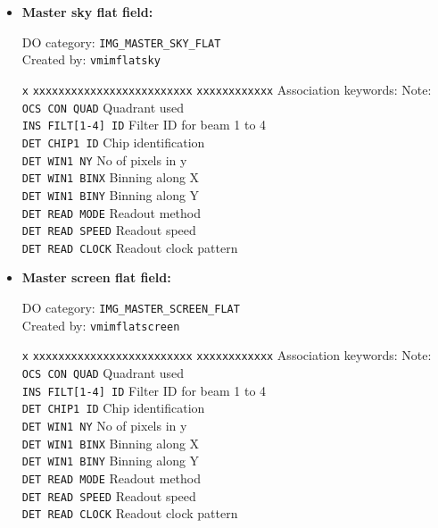 \begin{itemize}

\item {\bf Master sky flat field:}

DO category: {\tt IMG\_MASTER\_SKY\_FLAT} \\
Created by: {\tt vmimflatsky}

\begin{tabbing}
{\tt x} \= {\tt xxxxxxxxxxxxxxxxxxxxxxxxx} \= {\tt xxxxxxxxxxxx} \kill
\> Association keywords: \> Note: \\
\> {\tt OCS CON QUAD} \> Quadrant used \\
\> {\tt INS FILT[1-4] ID} \> Filter ID for beam 1 to 4 \\
\> {\tt DET CHIP1 ID} \> Chip identification \\
\> {\tt DET WIN1 NY} \> No of pixels in y \\
\> {\tt DET WIN1 BINX} \> Binning along X \\
\> {\tt DET WIN1 BINY} \> Binning along Y \\
\> {\tt DET READ MODE} \> Readout method \\
\> {\tt DET READ SPEED} \> Readout speed \\
\> {\tt DET READ CLOCK} \> Readout clock pattern \\
\end{tabbing}

\item {\bf Master screen flat field:}

DO category: {\tt IMG\_MASTER\_SCREEN\_FLAT} \\
Created by: {\tt vmimflatscreen}

\begin{tabbing}
{\tt x} \= {\tt xxxxxxxxxxxxxxxxxxxxxxxxx} \= {\tt xxxxxxxxxxxx} \kill
\> Association keywords: \> Note: \\
\> {\tt OCS CON QUAD} \> Quadrant used \\
\> {\tt INS FILT[1-4] ID} \> Filter ID for beam 1 to 4 \\
\> {\tt DET CHIP1 ID} \> Chip identification \\
\> {\tt DET WIN1 NY} \> No of pixels in y \\
\> {\tt DET WIN1 BINX} \> Binning along X \\
\> {\tt DET WIN1 BINY} \> Binning along Y \\
\> {\tt DET READ MODE} \> Readout method \\
\> {\tt DET READ SPEED} \> Readout speed \\
\> {\tt DET READ CLOCK} \> Readout clock pattern \\
\end{tabbing}


\end{itemize}

